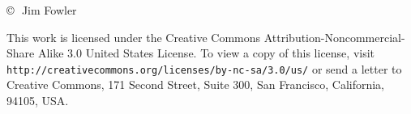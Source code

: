 \documentclass{article}
\begin{document}
\begin{landscape}

\null

\vfill

\parbox{1.5in}{\textsf{\footnotesize \copyright\,\number\year\ Jim Fowler}}
\parbox{8.5in}{\raggedright\textsf{\scriptsize This work is licensed under the Creative Commons Attribution-Noncommercial-Share Alike 3.0 United States License. To view a copy of this license, visit \texttt{http://creativecommons.org/licenses/by-nc-sa/3.0/us/} or send a letter to Creative Commons, 171 Second Street, Suite 300, San Francisco, California, 94105, USA.}}

\end{landscape}
\end{document}
